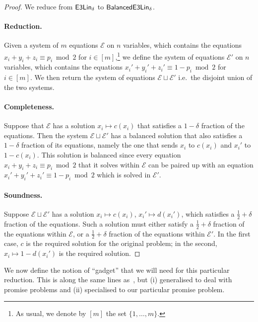 \documentclass[a4paper,11pt, DIV=11]{scrartcl}
\DeclareMathOperator{\elin}{\textnormal{\textsf{E3Lin}}}
\DeclareMathOperator{\belin}{\textnormal{\textsf{BalancedE3Lin}}}
\theoremstyle{plain}
\theoremstyle{definition}
\begin{document}
\begin{proof}
    We reduce from $\elin_\delta$ to $\belin_\delta$.

    \paragraph{Reduction.}
    Given a system of $m$ equations $\mathcal{E}$ on $n$ variables, which contains the equations $x_i + y_i + z_i \equiv p_i \bmod 2$ for $i \in [m]$,\footnote{As usual, we denote by $[m]$ the set $\{1,\ldots,m\}$.} we define the system of equations $\mathcal{E}'$ on $n$ variables, which contains the equations $x_i' + y_i' + z_i' \equiv 1 - p_i \bmod 2$ for $i \in [m]$. We then return the system of equations $\mathcal{E} \sqcup \mathcal{E}'$ i.e.~the disjoint union of the two systems.

    \paragraph{Completeness.} Suppose that $\mathcal{E}$ has a solution $x_i \mapsto c(x_i)$ that satisfies a $1 - \delta$ fraction of the equations. Then the system $\mathcal{E} \sqcup \mathcal{E}'$ has a balanced solution that also satisfies a $1 - \delta$ fraction of its equations, namely the one that sends $x_i$ to $c(x_i)$ and $x_i'$ to $1- c(x_i)$. This solution is balanced since every equation $x_i + y_i + z_i \equiv p_i \bmod 2$ that it solves within $\mathcal{E}$ can be paired up with an equation $x_i' + y_i' + z_i' \equiv 1 - p_i \bmod 2$ which is solved in $\mathcal{E}'$.

    \paragraph{Soundness.} Suppose $\mathcal{E} \sqcup \mathcal{E}'$ has a
    solution $x_i \mapsto c(x_i)$, $x_i' \mapsto d(x_i')$, which satisfies a $\frac{1}{2} + \delta$ fraction of the equations. Such a solution must either satisfy a $\frac{1}{2} + \delta$ fraction of the equations within $\mathcal{E}$, or a $\frac{1}{2} + \delta$ fraction of the equations within $\mathcal{E}'$. In the first case, $c$ is the required solution for the original problem; in the second, $x_i \mapsto 1 - d(x_i')$ is the required solution.
\end{proof}


We now define the notion of ``gadget'' that we will need for this particular reduction. This is along the same lines as~\cite{BGS:98,Trevisan00:sicomp}, but (i) generalised to deal with promise problems and (ii) specialised to our particular promise problem.
\end{document}
